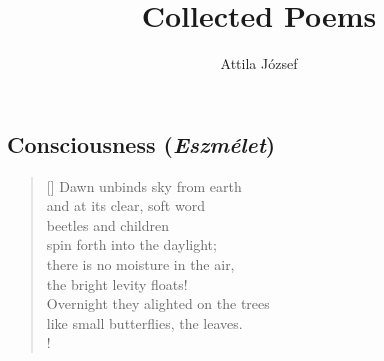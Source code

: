 \documentclass[a4paper,12pt,twoside,final]{book}
\title{Collected Poems}
\author{Attila József}
\begin{document}
\maketitle

\chapter{}
\section{Consciousness (\emph{Eszmélet})}




\settowidth{\versewidth}{Overnight they alighted on the trees}

\begin{verse}[\versewidth]
  Dawn unbinds sky from earth \\
  and at its clear, soft word \\
  beetles and children \\
  spin forth into the daylight; \\
  there is no moisture in the air, \\
  the bright levity floats! \\
  Overnight they alighted on the trees \\
  like small butterflies, the leaves. \\!
\end{verse}


\newpage

\settowidth{\versewidth}{a hajnal s tiszta, lágy szavára}
\end{document}
